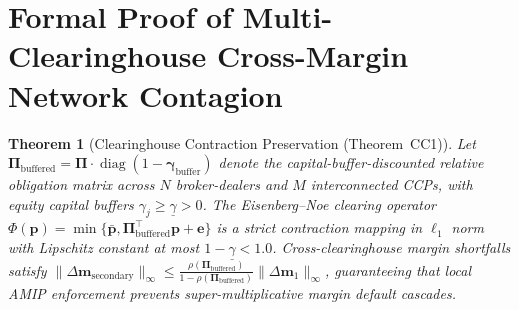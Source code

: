 \documentclass[11pt,a4paper]{article}
\newtheorem{theorem}{Theorem}[section]
\theoremstyle{definition}\newtheorem{definition}[theorem]{Definition}
\theoremstyle{remark}\newtheorem{remark}[theorem]{Remark}
\begin{document}
\section{Formal Proof of Multi-Clearinghouse Cross-Margin Network Contagion}
\label{sec:supp_clearinghouse_contagion}
\begin{theorem}[Clearinghouse Contraction Preservation (Theorem~CC1)]\label{thm:supp_cc1}
Let $\mathbf{\Pi}_{\text{buffered}} = \mathbf{\Pi} \cdot \operatorname{diag}(1 - \boldsymbol{\gamma}_{\text{buffer}})$ denote the capital-buffer-discounted relative obligation matrix across $N$ broker-dealers and $M$ interconnected CCPs, with equity capital buffers $\gamma_j \ge \underline{\gamma} > 0$.
The Eisenberg--Noe clearing operator \cite{eisenberg2001systemic,glasserman2015likely} $\Phi(\mathbf{p}) = \min\{\bar{\mathbf{p}}, \mathbf{\Pi}_{\text{buffered}}^\top \mathbf{p} + \mathbf{e}\}$ is a strict contraction mapping in $\ell_1$ norm with Lipschitz constant at most $1 - \underline{\gamma} < 1.0$. Cross-clearinghouse margin shortfalls satisfy $\|\Delta \mathbf{m}_{\text{secondary}}\|_\infty \le \frac{\rho(\mathbf{\Pi}_{\text{buffered}})}{1 - \rho(\mathbf{\Pi}_{\text{buffered}})} \|\Delta \mathbf{m}_1\|_\infty$, guaranteeing that local AMIP enforcement prevents super-multiplicative margin default cascades.
\end{theorem}
\end{document}
